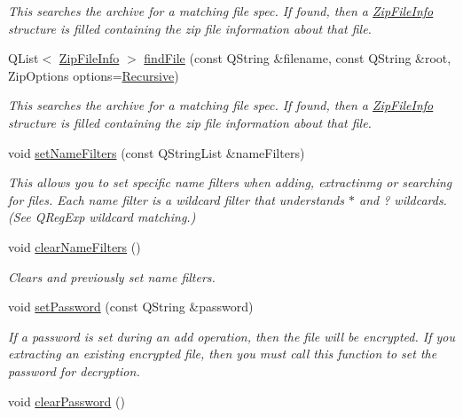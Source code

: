 \begin{DoxyCompactItemize}
\begin{DoxyCompactList}\small\item\em This searches the archive for a matching file spec. If found, then a \hyperlink{class_zip_file_info}{Zip\+File\+Info} structure is filled containing the zip file information about that file. \end{DoxyCompactList}\item 
Q\+List$<$ \hyperlink{class_zip_file_info}{Zip\+File\+Info} $>$ \hyperlink{class_ab_zip_a3a60562106d519e49173bb0fdc42808f}{find\+File} (const Q\+String \&filename, const Q\+String \&root, Zip\+Options options=\hyperlink{class_ab_zip_a9c4f57d6b8d9a449c2eb6c4d4e53c9d5a23555db8b40ecaf3966a205023b515e3}{Recursive})
\begin{DoxyCompactList}\small\item\em This searches the archive for a matching file spec. If found, then a \hyperlink{class_zip_file_info}{Zip\+File\+Info} structure is filled containing the zip file information about that file. \end{DoxyCompactList}\item 
void \hyperlink{class_ab_zip_a80724c61b6812aaea06f575860bed8e6}{set\+Name\+Filters} (const Q\+String\+List \&name\+Filters)
\begin{DoxyCompactList}\small\item\em This allows you to set specific name filters when adding, extractinmg or searching for files. Each name filter is a wildcard filter that understands $\ast$ and ? wildcards. (See Q\+Reg\+Exp wildcard matching.) \end{DoxyCompactList}\item 
void \hyperlink{class_ab_zip_a23197e4aeb30549b15adc0e8b5eaf239}{clear\+Name\+Filters} ()
\begin{DoxyCompactList}\small\item\em Clears and previously set name filters. \end{DoxyCompactList}\item 
void \hyperlink{class_ab_zip_a31f7636ca8c3ca66fd52b57c0f5b2328}{set\+Password} (const Q\+String \&password)
\begin{DoxyCompactList}\small\item\em If a password is set during an add operation, then the file will be encrypted. If you extracting an existing encrypted file, then you must call this function to set the password for decryption. \end{DoxyCompactList}\item 
void \hyperlink{class_ab_zip_afd354e102978d775abddf3263363c8d2}{clear\+Password} ()

\end{DoxyCompactItemize}
